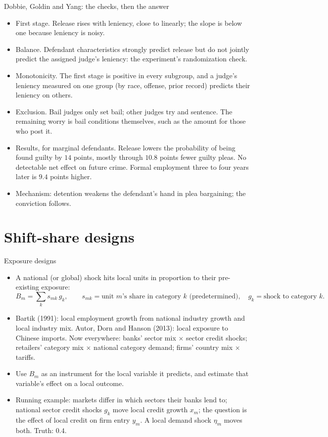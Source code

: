 \documentclass[aspectratio=169,11pt]{beamer}
\begin{document}
\begin{frame}{Dobbie, Goldin and Yang: the checks, then the answer}
\begin{itemize}
	\item \alert{First stage.} Release rises with leniency, close to linearly; the slope is below one because
	leniency is noisy.
	\item \alert{Balance.} Defendant characteristics strongly predict release but do not jointly predict the
	assigned judge's leniency: the experiment's randomization check.
	\item \alert{Monotonicity.} The first stage is positive in every subgroup, and a judge's leniency measured on
	one group (by race, offense, prior record) predicts their leniency on others.
	\item \alert{Exclusion.} Bail judges only set bail; other judges try and sentence. The remaining worry is
	bail conditions themselves, such as the amount for those who post it.
	\item \alert{Results, for marginal defendants.} Release lowers the probability of being found guilty by
	$14$ points, mostly through $10.8$ points fewer guilty pleas. No detectable net effect on future crime.
	Formal employment three to four years later is $9.4$ points higher.
	\item Mechanism: detention weakens the defendant's hand in plea bargaining; the conviction follows.
\end{itemize}
\end{frame}


\section{Shift-share designs}

\begin{frame}{Exposure designs}
\begin{itemize}
	\item A national (or global) shock hits local units in proportion to their \alert{pre-existing exposure}:
	\[
		B_m = \sum_{k} s_{mk}\, g_k, \qquad s_{mk} = \text{unit } m\text{'s share in category } k \text{ (predetermined)},\quad g_k = \text{shock to category } k .
	\]
	\medskip
	\item Bartik (1991): local employment growth from national industry growth and local industry mix.
	Autor, Dorn and Hanson (2013): local exposure to Chinese imports. Now everywhere: banks' sector mix
	$\times$ sector credit shocks; retailers' category mix $\times$ national category demand; firms' country
	mix $\times$ tariffs.
	\item Use $B_m$ as an instrument for the local variable it predicts, and estimate that variable's effect
	on a local outcome.
	\item Running example: markets differ in which sectors their banks lend to; national sector credit shocks
	$g_k$ move local credit growth $x_m$; the question is the effect of local credit on firm entry $y_m$. A
	local demand shock $\eta_m$ moves both. Truth: $0.4$.
\end{itemize}
\end{frame}
\end{document}
